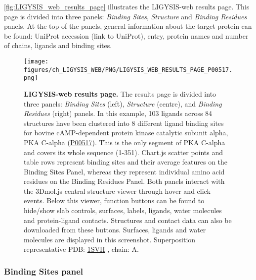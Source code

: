 \autoref{fig:LIGYSIS_web_results_page} illustrates the LIGYSIS-web results page. This page is divided into three panels: \textit{Binding Sites}, \textit{Structure} and \textit{Binding Residues} panels. At the top of the panels, general information about the target protein can be found: UniProt accession (link to UniProt), entry, protein names and number of chains, ligands and binding sites.

\begin{figure}[htb!]
    \centering
    \texttt{[image: figures/ch\_LIGYSIS\_WEB/PNG/LIGYSIS\_WEB\_RESULTS\_PAGE\_P00517.png]}
    \caption[LIGYSIS-web results page]{\textbf{LIGYSIS-web results page.} The results page is divided into three panels: \textit{Binding Sites} (left), \textit{Structure} (centre), and \textit{Binding Residues} (right) panels. In this example, 103 ligands across 84 structures have been clustered into 8 different ligand binding sites for bovine cAMP-dependent protein kinase catalytic subunit alpha, PKA C-alpha (\href{https://www.uniprot.org/uniprotkb/P00517/entry}{P00517}). This is the only segment of PKA C-alpha and covers its whole sequence (1-351). Chart.js scatter points and table rows represent binding sites and their average features on the Binding Sites Panel, whereas they represent individual amino acid residues on the Binding Residues Panel. Both panels interact with the 3Dmol.js central structure viewer through hover and click events. Below this viewer, function buttons can be found to hide/show slab controls, surfaces, labels, ligands, water molecules and protein-ligand contacts. Structures and contact data can also be downloaded from these buttons. Surfaces, ligands and water molecules are displayed in this screenshot. Superposition representative PDB: \href{https://www.ebi.ac.uk/pdbe/entry/pdb/1svh}{1SVH} \cite{BREITENLECHNER_2004_PKB}, chain: A.}
    \label{fig:LIGYSIS_web_results_page}
\end{figure}

\subsubsection{Binding Sites panel}

